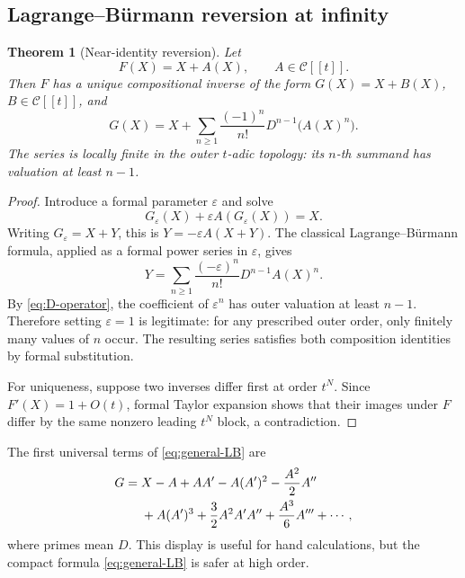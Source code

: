 \documentclass[11pt,oneside]{article}
\theoremstyle{plain}
\newtheorem{theorem}{Theorem}[section]
\theoremstyle{definition}
\theoremstyle{remark}
\newcommand{\Ccal}{\mathcal{C}}
\begin{document}
\subsection{Lagrange--B\"urmann reversion at infinity}

\begin{theorem}[Near-identity reversion]
\label{thm:general-reversion}
Let
\begin{equation}
 F(X)=X+A(X),\qquad A\in\Ccal[[t]].
 \label{eq:F-general}
\end{equation}
Then \(F\) has a unique compositional inverse of the form
\(G(X)=X+B(X)\), \(B\in\Ccal[[t]]\), and
\begin{equation}
 \boxed{
 G(X)=X+\sum_{n\ge1}\frac{(-1)^n}{n!}
 D^{n-1}\bigl(A(X)^n\bigr).}
 \label{eq:general-LB}
\end{equation}
The series is locally finite in the outer \(t\)-adic topology: its \(n\)-th
summand has valuation at least \(n-1\).
\end{theorem}

\begin{proof}
Introduce a formal parameter \(\varepsilon\) and solve
\[
 G_{\varepsilon}(X)+\varepsilon A(G_{\varepsilon}(X))=X.
\]
Writing \(G_{\varepsilon}=X+Y\), this is
\(Y=-\varepsilon A(X+Y)\).  The classical Lagrange--B\"urmann formula,
applied as a formal power series in \(\varepsilon\), gives
\[
 Y=\sum_{n\ge1}\frac{(-\varepsilon)^n}{n!}D^{n-1}A(X)^n.
\]
By \eqref{eq:D-operator}, the coefficient of \(\varepsilon^n\) has outer
valuation at least \(n-1\).  Therefore setting \(\varepsilon=1\) is legitimate:
for any prescribed outer order, only finitely many values of \(n\) occur.  The
resulting series satisfies both composition identities by formal substitution.

For uniqueness, suppose two inverses differ first at order \(t^N\).  Since
\(F'(X)=1+O(t)\), formal Taylor expansion shows that their images under \(F\)
differ by the same nonzero leading \(t^N\) block, a contradiction.
\end{proof}

The first universal terms of \eqref{eq:general-LB} are
\begin{align}
 G={}&X-A+AA'
 -A(A')^2-\frac{A^2}{2}A''\notag\\
 &+A(A')^3+\frac32A^2A'A''+\frac{A^3}{6}A'''
 +\cdots,
 \label{eq:universal-derivative-terms}
\end{align}
where primes mean \(D\).  This display is useful for hand calculations, but the
compact formula \eqref{eq:general-LB} is safer at high order.
\end{document}
